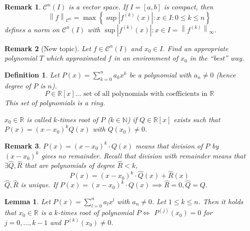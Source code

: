 \documentclass{article}
\newtheorem{definition}{Definition}  \numberwithin{definition}{section}
\newtheorem{lemma}{Lemma}  \numberwithin{lemma}{section}
\newtheorem{remark}{Remark}  \numberwithin{remark}{section}
\newcommand{\set}[1]{\left\{#1\right\}}
\newcommand{\norm}[1]{\left\|#1\right\|}
\newcommand{\card}[1]{\left|#1\right|}
\begin{document}
\begin{remark}
  $\mathcal C^n(I)$ is a vector space.
  If $I = [a,b]$ is compact, then
  \[ \norm{f}_{\mathcal C^n} = \max\set{\sup{\card{f^{(k)}(x)}: x \in I}: 0 \leq k \leq n} \]
  defines a norm on $\mathcal C^n(I)$ with $\sup{\card{f^{(k)}(x)}: x \in I} = {\norm{f^{(k)}}_{\infty}}$.
\end{remark}

\begin{remark}[New topic]
  Let $f \in \mathcal C^n(I)$ and $x_0 \in I$. Find an appropriate polynomial $T$ which approximated $f$ in an environment of $x_0$ in the \enquote{best} way.
\end{remark}

\begin{definition} %
  Let $P(x) = \sum_{k=0}^n a_k x^k$ be a polynomial with $a_n \neq 0$
  (hence degree of $P$ is $n$).
  \[ P \in \mathbb R[x] \dots \text{ set of all polynomials with coefficients in } \mathbb R \]
  This set of polynomials is a ring.

  $x_0 \in \mathbb R$ is called $k$-times root of $P$ ($k \in \mathbb N$) if $Q \in \mathbb R[x]$ exists such that
  $P(x) = (x - x_0)^k Q(x)$ with $Q(x_0) \neq 0$.
\end{definition}

\begin{remark}
  $P(x) = (x - x_0)^k \cdot Q(x)$ means that division of $P$ by $(x - x_0)^k$ gives no remainder.
  Recall that division with remainder means that $\exists \hat Q, \hat R$ that are polynomials of degree $\hat R < k$,
  \[ P(x) = (x - x_0)^k \cdot \hat Q(x) + \hat R(x) \]
  $\hat Q, \hat R$ is unique.
  If $P(x) = (x - x_0)^k \cdot Q(x) \implies \hat R = 0, \hat Q = Q$.
\end{remark}

\begin{lemma} %
  \label{lemma2-2}
  Let $P(x) = \sum_{l=0}^n a_l x^l$ with $a_n \neq 0$.
  Let $1 \leq k \leq n$. Then it holds that $x_0 \in \mathbb R$ is a $k$-times root of polynomial $P \iff$
  $P^{(j)}(x_0) = 0$ for $j = 0, \ldots, k-1$ and $P^{(k)}(x_0) \neq 0$.
\end{lemma}
\end{document}
